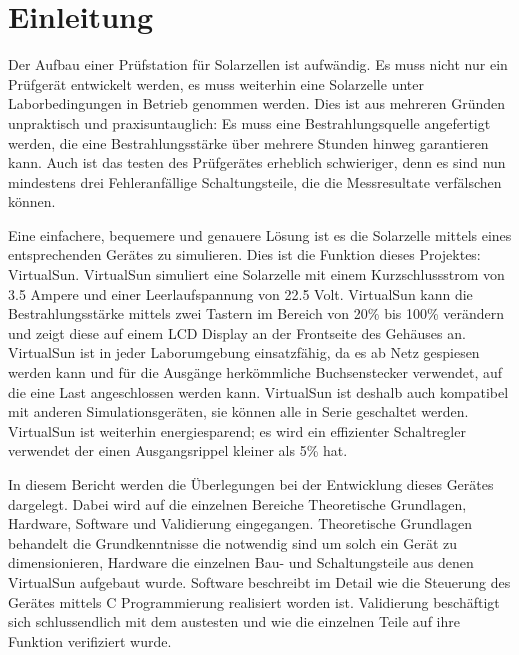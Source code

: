 \documentclass[a4paper]{fhnwreport} %
\begin{document}
\section{Einleitung}

Der Aufbau einer Prüfstation für Solarzellen ist aufwändig. Es muss nicht nur ein Prüfgerät entwickelt werden, es muss weiterhin eine Solarzelle unter Laborbedingungen in Betrieb genommen werden. Dies ist aus mehreren Gründen unpraktisch und praxisuntauglich: Es muss eine Bestrahlungsquelle angefertigt werden, die eine Bestrahlungsstärke über mehrere Stunden hinweg garantieren kann. Auch ist das testen des Prüfgerätes erheblich schwieriger, denn es sind nun mindestens drei Fehleranfällige Schaltungsteile, die die Messresultate verfälschen können. 

Eine einfachere, bequemere und genauere Lösung ist es die Solarzelle mittels eines entsprechenden Gerätes zu simulieren. Dies ist die Funktion dieses Projektes: VirtualSun.
VirtualSun simuliert eine Solarzelle mit einem Kurzschlussstrom von 3.5 Ampere und einer Leerlaufspannung von 22.5 Volt. VirtualSun kann die Bestrahlungsstärke mittels zwei Tastern im Bereich von 20\% bis 100\% verändern und zeigt diese auf einem LCD Display an der Frontseite des Gehäuses an. VirtualSun ist in jeder Laborumgebung einsatzfähig, da es ab Netz gespiesen werden kann und für die Ausgänge herkömmliche Buchsenstecker verwendet, auf die eine Last angeschlossen werden kann. VirtualSun ist deshalb auch kompatibel mit anderen Simulationsgeräten, sie können alle in Serie geschaltet werden. VirtualSun ist weiterhin energiesparend; es wird ein effizienter Schaltregler verwendet der einen Ausgangsrippel kleiner als 5\% hat. 

In diesem Bericht werden die Überlegungen bei der Entwicklung dieses Gerätes dargelegt. Dabei wird auf die einzelnen Bereiche Theoretische Grundlagen, Hardware, Software und Validierung eingegangen. Theoretische Grundlagen behandelt die Grundkenntnisse die notwendig sind um solch ein Gerät zu dimensionieren, Hardware die einzelnen Bau- und Schaltungsteile aus denen VirtualSun aufgebaut wurde. Software beschreibt im Detail wie die Steuerung des Gerätes mittels C Programmierung realisiert worden ist. Validierung beschäftigt sich schlussendlich mit dem austesten und wie die einzelnen Teile auf ihre Funktion verifiziert wurde.
\newpage
%
%
\end{document}
